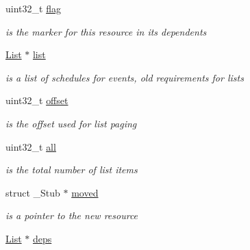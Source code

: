 \begin{DoxyCompactItemize}
\begin{tabbing}
\end{tabbing}\item 
\mbox{\label{structStub_a0523681b16fbb6eda78be66d1b193395}} 
uint32\+\_\+t \hyperlink{structStub_a0523681b16fbb6eda78be66d1b193395}{flag}
\begin{DoxyCompactList}\small\item\em is the marker for this resource in its dependents \end{DoxyCompactList}\item 
\mbox{\label{structStub_aee2b6394a09ce36a29545ee6e91fc995}} 
\hyperlink{structList}{List} $\ast$ \hyperlink{structStub_aee2b6394a09ce36a29545ee6e91fc995}{list}
\begin{DoxyCompactList}\small\item\em is a list of schedules for events, old requirements for lists \end{DoxyCompactList}\item 
\mbox{\label{structStub_ae2746157cf93bf0e84ccb0d04cbfc5a7}} 
uint32\+\_\+t \hyperlink{structStub_ae2746157cf93bf0e84ccb0d04cbfc5a7}{offset}
\begin{DoxyCompactList}\small\item\em is the offset used for list paging \end{DoxyCompactList}\item 
\mbox{\label{structStub_a64d1c4bd1952753d74f1ead9c6bb0cca}} 
uint32\+\_\+t \hyperlink{structStub_a64d1c4bd1952753d74f1ead9c6bb0cca}{all}
\begin{DoxyCompactList}\small\item\em is the total number of list items \end{DoxyCompactList}\item 
\mbox{\label{structStub_a374ef6513cdc775ae5b3d3f1f5f6ba80}} 
struct \+\_\+\+Stub $\ast$ \hyperlink{structStub_a374ef6513cdc775ae5b3d3f1f5f6ba80}{moved}
\begin{DoxyCompactList}\small\item\em is a pointer to the new resource \end{DoxyCompactList}\item 
\mbox{\label{structStub_a8e01c70d5988a8873ede2fb988c6d980}} 
\hyperlink{structList}{List} $\ast$ \hyperlink{structStub_a8e01c70d5988a8873ede2fb988c6d980}{deps}

\end{DoxyCompactItemize}
